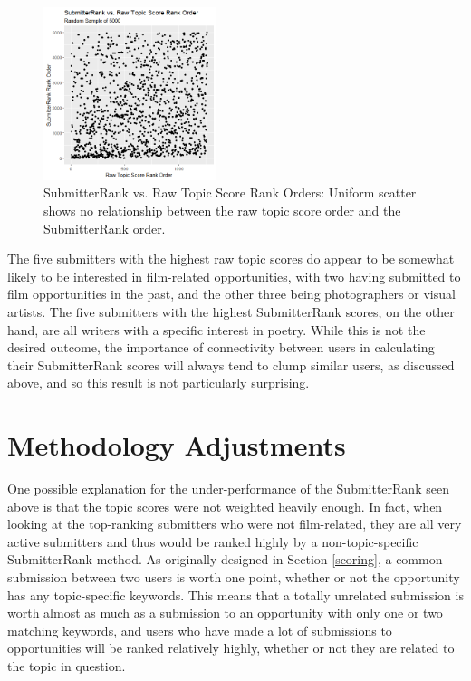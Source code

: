 \documentclass[12pt]{report}   %
\begin{document}
\begin{figure}[h]
    \centering
    \begin{minipage}{0.9\textwidth}
	\captionsetup{font=scriptsize}
        \centering
        \includegraphics[width=0.45\textwidth]{rankOrder5000_orig.png} %
        \caption{SubmitterRank vs. Raw Topic Score Rank Orders: Uniform scatter shows no relationship between the raw topic score order and the SubmitterRank order.}
	  \label{fig:5000cor_orig}
    \end{minipage}
 \end{figure}

The five submitters with the highest raw topic scores do appear to be somewhat likely to be interested in film-related opportunities, with two having submitted to film opportunities in the past, and the other three being photographers or visual artists. The five submitters with the highest SubmitterRank scores, on the other hand, are all writers with a specific interest in poetry. While this is not the desired outcome, the importance of connectivity between users in calculating their SubmitterRank scores will always tend to clump similar users, as discussed above, and so this result is not particularly surprising.

\section{Methodology Adjustments}

One possible explanation for the under-performance of the SubmitterRank seen above is that the topic scores were not weighted heavily enough. In fact, when looking at the top-ranking submitters who were not film-related, they are all very active submitters and thus would be ranked highly by a non-topic-specific SubmitterRank method. As originally designed in Section \ref{scoring}, a common submission between two users is worth one point, whether or not the opportunity has any topic-specific keywords. This means that a totally unrelated submission is worth almost as much as a submission to an opportunity with only one or two matching keywords, and users who have made a lot of submissions to opportunities will be ranked relatively highly, whether or not they are related to the topic in question.
\end{document}
